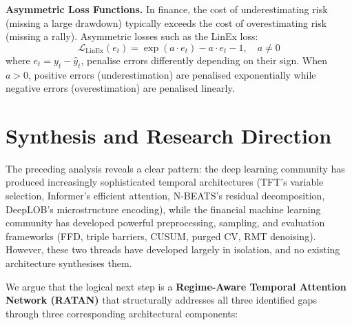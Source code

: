 \documentclass[conference]{IEEEtran}
\begin{document}
\textbf{Asymmetric Loss Functions.} In finance, the cost of underestimating risk (missing a large drawdown) typically exceeds the cost of overestimating risk (missing a rally). Asymmetric losses such as the LinEx loss:
\begin{equation}
\mathcal{L}_{\text{LinEx}}(e_t) = \exp(a \cdot e_t) - a \cdot e_t - 1, \quad a \neq 0
\end{equation}
where $e_t = y_t - \hat{y}_t$, penalise errors differently depending on their sign. When $a > 0$, positive errors (underestimation) are penalised exponentially while negative errors (overestimation) are penalised linearly.

\section{Synthesis and Research Direction}
\label{sec:synthesis}

The preceding analysis reveals a clear pattern: the deep learning community has produced increasingly sophisticated temporal architectures (TFT's variable selection, Informer's efficient attention, N-BEATS's residual decomposition, DeepLOB's microstructure encoding), while the financial machine learning community has developed powerful preprocessing, sampling, and evaluation frameworks (FFD, triple barriers, CUSUM, purged CV, RMT denoising). However, these two threads have developed largely in isolation, and no existing architecture synthesises them.

We argue that the logical next step is a \textbf{Regime-Aware Temporal Attention Network (RATAN)} that structurally addresses all three identified gaps through three corresponding architectural components:
\end{document}
